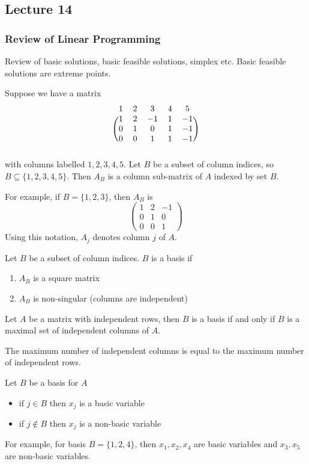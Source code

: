 \subsection{Lecture 14}
\subsubsection{Review of Linear Programming}
Review of basic solutions, basic feasible solutions, simplex etc. Basic feasible solutions are extreme points.
\begin{definition}
	Suppose we have a matrix
	$$\begin{blockarray}{ccccc}
			1 & 2 & 3 & 4 & 5 \\
			\begin{block}{(ccccc)}
				1 & 2 & -1 & 1 & -1 \\
				0 & 1 & 0 & 1 & -1 \\
				0 & 0 & 1 & 1 & -1 \\
			\end{block}
		\end{blockarray}$$
	with columns labelled $1,2,3,4,5$. Let $B$ be a subset of column indices, so $B \subseteq \{1,2,3,4,5\}$. Then $A_B$ is a column sub-matrix of $A$ indexed by set $B$.

	For example, if $B = \{1,2,3\}$, then $A_B$ is
	$$\begin{pmatrix}
			1 & 2 & -1 \\
			0 & 1 & 0  \\
			0 & 0 & 1
		\end{pmatrix}$$
	Using this notation, $A_j$ denotes column $j$ of $A$.
\end{definition}
\begin{definition}[Basis]
	Let $B$ be a subset of column indices. $B$ is a basis if
	\begin{enumerate}
		\item $A_B$ is a square matrix
		\item $A_B$ is non-singular (columns are independent)
	\end{enumerate}
	Let $A$ be a matrix with independent rows, then $B$ is a basis if and only if $B$ is a maximal set of independent columns of $A$.
\end{definition}
\begin{theorem}[]
	The maximum number of independent columns is equal to the maximum number of independent rows.

\end{theorem}
\begin{definition}
	Let $B$ be a basis for $A$
	\begin{itemize}
		\item if $j \in B$ then $x_j$ is a basic variable
		\item if $j \notin B$ then $x_j$ is a non-basic variable
	\end{itemize}
	For example, for basis $B = \{1,2,4\}$, then $x_1,x_2,x_4$ are basic variables and $x_3,x_5$ are non-basic variables.
\end{definition}
